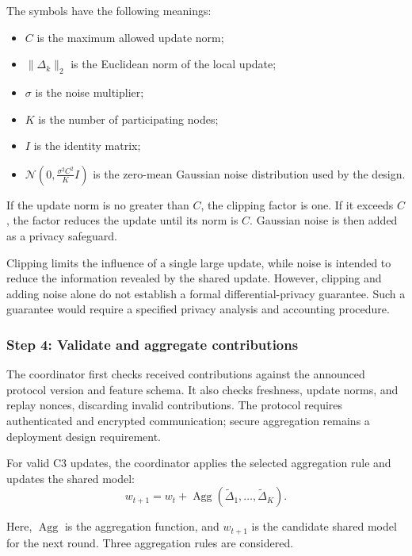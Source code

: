 \documentclass[11pt,a4paper]{article}
\begin{document}
The symbols have the following meanings:
\begin{itemize}
    \item $C$ is the maximum allowed update norm;
    \item $\|\Delta_k\|_2$ is the Euclidean norm of the local update;
    \item $\sigma$ is the noise multiplier;
    \item $K$ is the number of participating nodes;
    \item $I$ is the identity matrix;
    \item $\mathcal N(0,\frac{\sigma^2 C^2}{K}I)$ is the
    zero-mean Gaussian noise distribution used by the design.
\end{itemize}

If the update norm is no greater than $C$, the clipping factor is
one. If it exceeds $C$, the factor reduces the update until its norm
is $C$. Gaussian noise is then added as a privacy safeguard.

Clipping limits the influence of a single large update, while noise
is intended to reduce the information revealed by the shared update.
However, clipping and adding noise alone do not establish a formal
differential-privacy guarantee. Such a guarantee would require a
specified privacy analysis and accounting procedure.

\subsubsection{Step 4: Validate and aggregate contributions}

The coordinator first checks received contributions against the
announced protocol version and feature schema. It also checks
freshness, update norms, and replay nonces, discarding invalid
contributions. The protocol requires authenticated and encrypted
communication; secure aggregation remains a deployment design
requirement.

For valid C3 updates, the coordinator applies the selected aggregation
rule and updates the shared model:
\begin{equation}
w_{t+1}
=
w_t+
\operatorname{Agg}\!\left(
\widetilde{\Delta}_1,\ldots,
\widetilde{\Delta}_K
\right).
\label{eq:protocol-model-aggregation}
\end{equation}

Here, $\operatorname{Agg}$ is the aggregation function, and
$w_{t+1}$ is the candidate shared model for the next round. Three
aggregation rules are considered.
\end{document}
